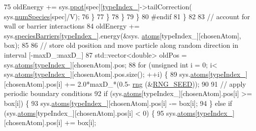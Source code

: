 \begin{DoxyCode}
75                                     oldEnergy += sys.\hyperlink{classsim_system_ad2e290b5963f132e6a3a56cee35c8e9f}{ppot}[spec][\hyperlink{classmc_move_acb731965547b0326ef318ec96da8b46a}{typeIndex\_}]->tailCorrection(
      sys.\hyperlink{classsim_system_a9eea865e6dc1cff377b1e79c4d9c23f0}{numSpecies}[spec]/V);
76                                 \}
77                     \}
78                 \}
79             \}
80 \textcolor{preprocessor}{#endif}
81 \textcolor{preprocessor}{}        \}
82 
83         \textcolor{comment}{// account for wall or barrier interactions}
84         oldEnergy += sys.\hyperlink{classsim_system_a5ae652ff4519f39c3862abae32a9581b}{speciesBarriers}[\hyperlink{classmc_move_acb731965547b0326ef318ec96da8b46a}{typeIndex\_}].energy(&sys.
      \hyperlink{classsim_system_a90421b19082f7fb8fc23b7264b1161e4}{atoms}[typeIndex\_][chosenAtom], box);
85 
86         \textcolor{comment}{// store old position and move particle along random direction in interval [-maxD\_:maxD\_]}
87         std::vector<double> oldPos = sys.\hyperlink{classsim_system_a90421b19082f7fb8fc23b7264b1161e4}{atoms}[\hyperlink{classmc_move_acb731965547b0326ef318ec96da8b46a}{typeIndex\_}][chosenAtom].pos;
88         \textcolor{keywordflow}{for} (\textcolor{keywordtype}{unsigned} \textcolor{keywordtype}{int} i = 0; i< sys.\hyperlink{classsim_system_a90421b19082f7fb8fc23b7264b1161e4}{atoms}[\hyperlink{classmc_move_acb731965547b0326ef318ec96da8b46a}{typeIndex\_}][chosenAtom].pos.size(); ++i) \{
89             sys.\hyperlink{classsim_system_a90421b19082f7fb8fc23b7264b1161e4}{atoms}[\hyperlink{classmc_move_acb731965547b0326ef318ec96da8b46a}{typeIndex\_}][chosenAtom].pos[i] += 2.0*maxD\_*(0.5-
      \hyperlink{utilities_8cpp_a0f9542af4b475ac79cb679d7a8d14db0}{rng} (&\hyperlink{global_8h_a3f4e4ea24d5a5c66feae55d1f329c884}{RNG\_SEED}));
90 
91             \textcolor{comment}{// apply periodic boundary conditions}
92             \textcolor{keywordflow}{if} (sys.\hyperlink{classsim_system_a90421b19082f7fb8fc23b7264b1161e4}{atoms}[typeIndex\_][chosenAtom].pos[i] >= box[i]) \{
93                 sys.\hyperlink{classsim_system_a90421b19082f7fb8fc23b7264b1161e4}{atoms}[\hyperlink{classmc_move_acb731965547b0326ef318ec96da8b46a}{typeIndex\_}][chosenAtom].pos[i] -= box[i];
94             \} \textcolor{keywordflow}{else} \textcolor{keywordflow}{if} (sys.\hyperlink{classsim_system_a90421b19082f7fb8fc23b7264b1161e4}{atoms}[typeIndex\_][chosenAtom].pos[i] < 0) \{
95                 sys.\hyperlink{classsim_system_a90421b19082f7fb8fc23b7264b1161e4}{atoms}[\hyperlink{classmc_move_acb731965547b0326ef318ec96da8b46a}{typeIndex\_}][chosenAtom].pos[i] += box[i];

\end{DoxyCode}
